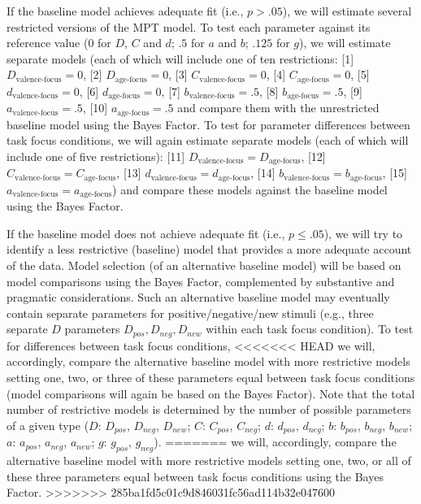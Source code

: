 \documentclass[
  doc,floatsintext]{apa6}
\begin{document}
If the baseline model achieves adequate fit (i.e., \(p > .05\)),
we will estimate several restricted versions of the MPT model.
To test each parameter against its reference value (\(0\) for \(D\), \(C\) and \(d\); \(.5\) for \(a\) and \(b\); \(.125\) for \(g\)),
we will estimate separate models (each of which will include one of ten restrictions:
{[}1{]} \(D_\textrm{valence-focus}=0\),
{[}2{]} \(D_\textrm{age-focus}=0\),
{[}3{]} \(C_\textrm{valence-focus}=0\),
{[}4{]} \(C_\textrm{age-focus}=0\),
{[}5{]} \(d_\textrm{valence-focus}=0\),
{[}6{]} \(d_\textrm{age-focus}=0\),
{[}7{]} \(b_\textrm{valence-focus}=.5\),
{[}8{]} \(b_\textrm{age-focus}=.5\),
{[}9{]} \(a_\textrm{valence-focus}=.5\),
{[}10{]} \(a_\textrm{age-focus}=.5\)
and compare them with the unrestricted baseline model using the Bayes Factor.
To test for parameter differences between task focus conditions,
we will again estimate separate models (each of which will include one of five restrictions):
{[}11{]} \(D_\textrm{valence-focus}=D_\textrm{age-focus}\),
{[}12{]} \(C_\textrm{valence-focus}=C_\textrm{age-focus}\),
{[}13{]} \(d_\textrm{valence-focus}=d_\textrm{age-focus}\),
{[}14{]} \(b_\textrm{valence-focus}=b_\textrm{age-focus}\),
{[}15{]} \(a_\textrm{valence-focus}=a_\textrm{age-focus}\))
and compare these models against the baseline model using the Bayes Factor.

If the baseline model does not achieve adequate fit (i.e., \(p \leq .05\)),
we will try to identify a less restrictive (baseline) model that provides a more adequate account of the data.
Model selection (of an alternative baseline model) will be based on model comparisons using the Bayes Factor,
complemented by substantive and pragmatic considerations.
Such an alternative baseline model may eventually contain separate parameters for positive/negative/new stimuli (e.g., three separate \(D\) parameters \(D_\textit{pos}, D_\textit{neg}, D_\textit{new}\) within each task focus condition).
To test for differences between task focus conditions,
<<<<<<< HEAD
we will, accordingly, compare the alternative baseline model with more restrictive models setting one, two, or three of these parameters equal between task focus conditions (model comparisons will again be based on the Bayes Factor).
Note that the total number of restrictive models is determined by the number of possible parameters of a given type (\(D\): \(D_\textit{pos}\), \(D_\textit{neg}\), \(D_\textit{new}\); \(C\): \(C_\textit{pos}\), \(C_\textit{neg}\); \(d\): \(d_\textit{pos}\), \(d_\textit{neg}\); \(b\): \(b_\textit{pos}\), \(b_\textit{neg}\), \(b_\textit{new}\); \(a\): \(a_\textit{pos}\), \(a_\textit{neg}\), \(a_\textit{new}\); \(g\): \(g_\textit{pos}\), \(g_\textit{neg}\)).
=======
we will, accordingly, compare the alternative baseline model with more restrictive models setting one, two, or all of these three parameters equal between task focus conditions using the Bayes Factor.
>>>>>>> 285ba1fd5c01c9d846031fc56ad114b32e047600
\end{document}
